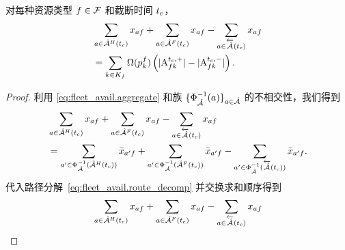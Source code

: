 
\begin{lemma}\label{lem:fleet_avail.expand}
对每种资源类型 $f\in\fleetSet$ 和截断时间 $\checkTime$，
\begin{equation*}
\begin{aligned}
    &\sum_{a\in\holdingArcTc{\checkTime}}\fleetAssignVar_{af}
     + \sum_{a\in\flightArcTc{\checkTime}}\fleetAssignVar_{af}
     - \sum_{a\in\invertArcTc{\checkTime}}\fleetAssignVar_{af}\\
    &=
    \sum_{k\in K_f}
        \routeAmount{\pathInRoute{f}{k}}
        \left(
            |\arcPosi|-|\arcNega|
        \right).
\end{aligned}
\end{equation*}
\end{lemma}
\begin{proof}
利用 \eqref{eq:fleet_avail.aggregate} 和族 $\{\Phi_{\arcSet}^{-1}(a)\}_{a\in\arcSet}$ 的不相交性，我们得到
\begin{equation*}
\begin{aligned}
    &\sum_{a\in\holdingArcTc{\checkTime}}\fleetAssignVar_{af}
     + \sum_{a\in\flightArcTc{\checkTime}}\fleetAssignVar_{af}
     - \sum_{a\in\invertArcTc{\checkTime}}\fleetAssignVar_{af}\\
    &=
    \sum_{a'\in\Phi_{\arcSet}^{-1}(\holdingArcTc{\checkTime})}\bar{\fleetAssignVar}_{a'f}
    +\sum_{a'\in\Phi_{\arcSet}^{-1}(\flightArcTc{\checkTime})}\bar{\fleetAssignVar}_{a'f}
    -\sum_{a'\in\Phi_{\arcSet}^{-1}(\invertArcTc{\checkTime})}\bar{\fleetAssignVar}_{a'f}.
\end{aligned}
\end{equation*}
代入路径分解~\eqref{eq:fleet_avail.route_decomp} 并交换求和顺序得到
\begin{equation*}
\begin{aligned}
    &\sum_{a\in\holdingArcTc{\checkTime}}\fleetAssignVar_{af}
     + \sum_{a\in\flightArcTc{\checkTime}}\fleetAssignVar_{af}
     - \sum_{a\in\invertArcTc{\checkTime}}\fleetAssignVar_{af}\\

\end{aligned}
\end{equation*}
\end{proof}
